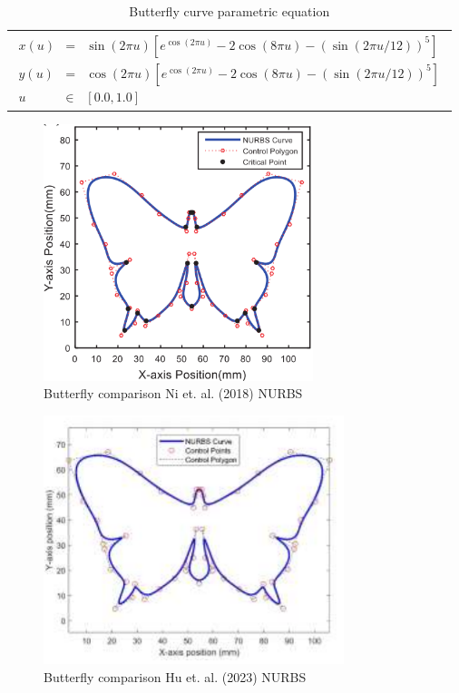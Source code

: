 \begin{table}[ht]
\begin{center}
\begin{tabular}{ p{16.0cm} }
\caption{Butterfly curve parametric equation}
\begin{eqnarray}
	x(u) & = & \sin(2\pi u) \left [ e^{\cos(2\pi u)} - 2\cos(8\pi u) - (\sin(2\pi u/12))^5 \right] \nonumber \\
	y(u) & = & \cos(2\pi u) \left [ e^{\cos(2\pi u)} - 2\cos(8\pi u) - (\sin(2\pi u/12))^5 \right] \nonumber \\
	u & \in & [0.0, 1.0] \nonumber
\end{eqnarray}
\end{tabular}
\end{center}
\end{table}


\clearpage
\pagebreak

\begin{figure}
	\caption{Butterfly comparison Ni et. al. (2018) NURBS}
	\label{Comparison-Butterfly-Ni-et-al(2018)}
	\centering
	\includegraphics[width=0.70\textwidth]{Images/Chap3/Comparison-Butterfly-Ni-et-al-2018.png} 
\end{figure}

\begin{figure}
	\caption{Butterfly comparison Hu et. al. (2023) NURBS }
	\label{Comparison-Butterfly-Hu-et-al(2023)}
	\centering
	\includegraphics[width=0.78\textwidth]{Images/Chap3/Comparison-Butterfly-Hu-et-al-2023.png} 
\end{figure}

